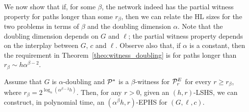 We now show that if, for some $\beta$, the network indeed has the partial witness property for paths longer than some $r_\beta$, then we can relate the HL sizes for the two problems in terms of $\beta$ and the doubling dimension $\alpha$. 
Note that the doubling dimension depends on $G$ and $\ell$; the partial witness property depends on the interplay between $G$, $c$ and $\ell$.
Observe also that, if $\alpha$ is a constant, then the requirement in Theorem~\ref{theo:witness_doubling} is for paths longer than $r_\beta\sim h\alpha^{\beta-2}$.
\begin{theorem}\label{theo:witness_doubling}
	Assume that $G$ is $\alpha$-doubling and $\mathcal{P}^*$ is a $\beta$-witness for $\mathcal{P}^E_r$ for every $r\geq r_\beta$, where $r_\beta=2^{\log_\alpha(\alpha^{\beta-2} h)}$. 
	Then, for any $r>0$, given an $(h,r)$-LSHS, we can construct, in polynomial time, an $(\alpha^{\beta} h,r)$-EPHS for $(G,\ell,c)$. 
\end{theorem}

